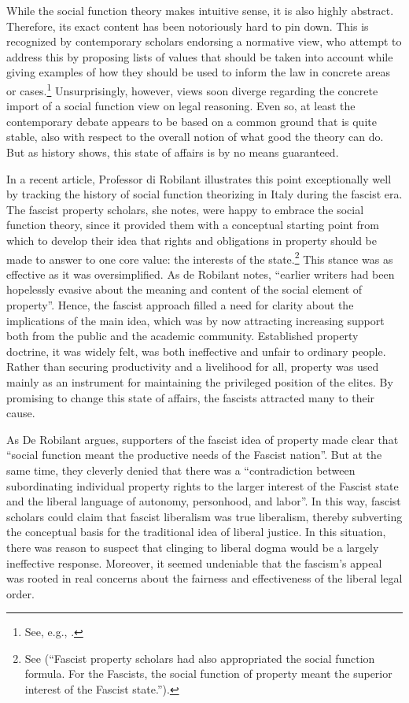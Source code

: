 While the social function theory makes intuitive sense, it is also highly abstract. Therefore, its exact content has been notoriously hard to pin down. This is recognized by contemporary scholars endorsing a normative view, who attempt to address this by proposing lists of values that should be taken into account while giving examples of how they should be used to inform the law in concrete areas or cases.\footnote{See, e.g., \cite{alexander14,alexander11,dagan07}.} Unsurprisingly, however, views soon diverge regarding the concrete import of a social function view on legal reasoning. Even so, at least the contemporary debate appears to be based on a common ground that is quite stable, also with respect to the overall notion of what good the theory can do. But as history shows, this state of affairs is by no means guaranteed. 

In a recent article, Professor di Robilant illustrates this point exceptionally well by tracking the history of social function theorizing in Italy during the fascist era. The fascist property scholars, she notes, were happy to embrace the social function theory, since it provided them with a conceptual starting point from which to develop their idea that rights and obligations in property should be made to answer to one core value: the interests of the state.\footnote{See \cite[908-909]{robilant13} (``Fascist property scholars had also appropriated the social function formula. For the Fascists, the social function of property meant the superior interest of the Fascist state.'').} This stance was as effective as it was oversimplified. As de Robilant notes, ``earlier writers had been hopelessly evasive about the meaning and content of the social element of property''. Hence, the fascist approach filled a need for clarity about the implications of the main idea, which was by now attracting increasing support both from the public and the academic community. Established property doctrine, it was widely felt, was both ineffective and unfair to ordinary people. Rather than securing productivity and a livelihood for all, property was used mainly as an instrument for maintaining the privileged position of the elites. By promising to change this state of affairs, the fascists attracted many to their cause.

As De Robilant argues, supporters of the fascist idea of property made clear that ``social function meant the productive needs of the Fascist nation''. But at the same time, they cleverly denied that there was a ``contradiction between subordinating individual property rights to the larger interest of the Fascist state and the liberal language of autonomy, personhood, and labor''. In this way, fascist scholars could claim that fascist liberalism was true liberalism, thereby subverting the conceptual basis for the traditional idea of liberal justice. In this situation, there was reason to suspect that clinging to liberal dogma would be a largely ineffective response. Moreover, it seemed undeniable that the fascism's appeal was rooted in real concerns about the fairness and effectiveness of the liberal legal order. 

